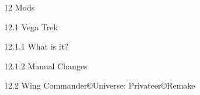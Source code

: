 \documentclass{article}
\begin{document}
12 Mods 











































































































12.1 Vega Trek 



12.1.1 What is it? 



12.1.2 Manual Changes 



12.2 Wing Commander\copyright  Universe: Privateer\copyright  Remake
\end{document}
